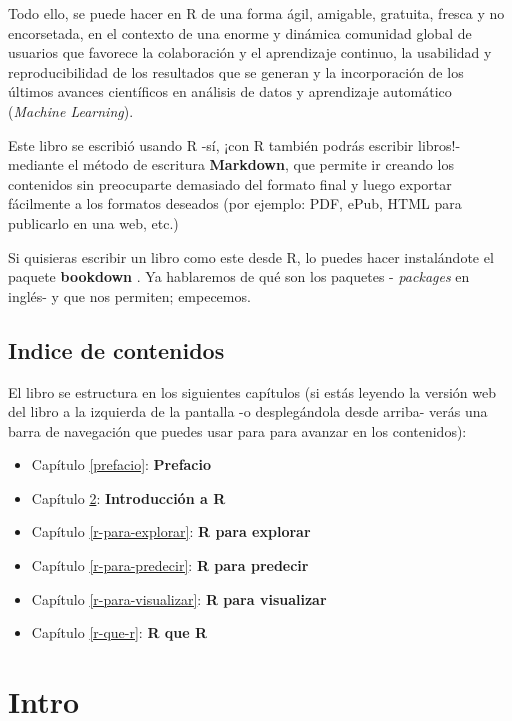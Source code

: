 \documentclass[]{book}
\theoremstyle{definition}
\theoremstyle{definition}
\theoremstyle{definition}
\theoremstyle{remark}
\begin{document}
Todo ello, se puede hacer en R de una forma ágil, amigable, gratuita,
fresca y no encorsetada, en el contexto de una enorme y dinámica
comunidad global de usuarios que favorece la colaboración y el
aprendizaje continuo, la usabilidad y reproducibilidad de los resultados
que se generan y la incorporación de los últimos avances científicos en
análisis de datos y aprendizaje automático (\emph{Machine Learning}).

Este libro se escribió usando R -sí, ¡con R también podrás escribir
libros!- mediante el método de escritura \textbf{Markdown}, que permite
ir creando los contenidos sin preocuparte demasiado del formato final y
luego exportar fácilmente a los formatos deseados (por ejemplo: PDF,
ePub, HTML para publicarlo en una web, etc.)

Si quisieras escribir un libro como este desde R, lo puedes hacer
instalándote el paquete \textbf{bookdown} \citep{R-bookdown}. Ya
hablaremos de qué son los paquetes - \emph{packages} en inglés- y que
nos permiten; empecemos.

\hypertarget{indice-de-contenidos}{%
\section{Indice de contenidos}\label{indice-de-contenidos}}

El libro se estructura en los siguientes capítulos (si estás leyendo la
versión web del libro a la izquierda de la pantalla -o desplegándola
desde arriba- verás una barra de navegación que puedes usar para para
avanzar en los contenidos):

\begin{itemize}
\item
  Capítulo \ref{prefacio}: \textbf{Prefacio}
\item
  Capítulo \ref{intro}: \textbf{Introducción a R}
\item
  Capítulo \ref{r-para-explorar}: \textbf{R para explorar}
\item
  Capítulo \ref{r-para-predecir}: \textbf{R para predecir}
\item
  Capítulo \ref{r-para-visualizar}: \textbf{R para visualizar}
\item
  Capítulo \ref{r-que-r}: \textbf{R que R}
\end{itemize}

\hypertarget{intro}{%
\chapter{Intro}\label{intro}}
\end{document}
